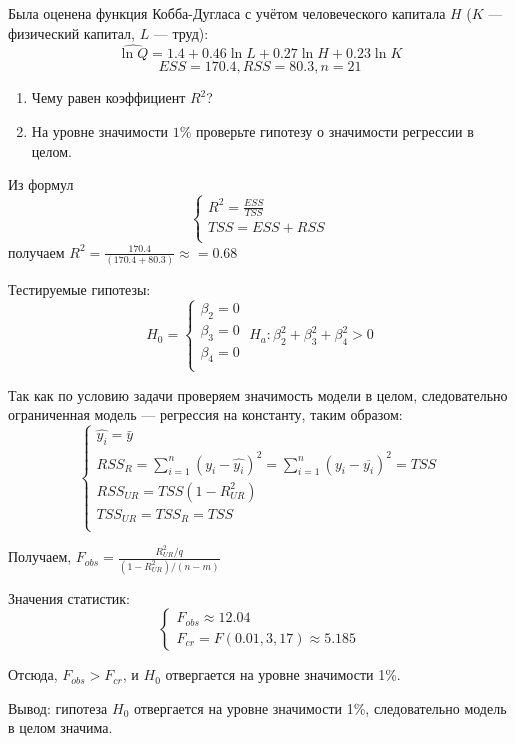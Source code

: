\begin{problem}
Была оценена функция Кобба-Дугласа с учётом человеческого капитала $H$ ($K$ — физический капитал, $L$ — труд):
\[
\widehat{\ln Q} = 1.4 + 0.46\ln L + 0.27\ln H + 0.23\ln K
\]
\[
ESS = 170.4, RSS = 80.3, n = 21
\]
\begin{enumerate}
\item Чему равен коэффициент $R^2$?
\item На уровне значимости $1\%$ проверьте гипотезу о значимости регрессии в целом.
\end{enumerate}


\begin{sol}
Из формул
\[
\begin{cases}
R^2=\frac{ESS}{TSS}\\
TSS=ESS+RSS\\
\end{cases}
\]
получаем $R^2=\frac{170.4}{(170.4+80.3)}\approx=0.68$

Тестируемые гипотезы:
\[
H_0=
\begin{cases}
\beta_2=0\\
\beta_3=0\\
\beta_4=0\\
\end{cases}
\;
H_a:\beta_2^2+\beta_3^2+\beta_4^2>0
\]

Так как по условию задачи проверяем значимость модели в целом, следовательно ограниченная модель — регрессия на константу, таким образом:
\[
\begin{cases}
\widehat{y_i}=\bar{y}\\
RSS_{R}=\sum_{i=1}^{n}(y_i-\widehat{y_i})^2=\sum_{i=1}^{n}(y_i-\overline{y_i})^2=TSS\\
RSS_{UR}=TSS(1-R^2_{UR})\\
TSS_{UR}=TSS_{R}=TSS\\
\end{cases}
\]

Получаем, $F_{obs}=\frac{R_{UR}^2/q}{(1-R^2_{UR})/(n-m)}$

Значения статистик:
\[
\begin{cases}
F_{obs}\approx 12.04\\
F_{cr}=F(0.01,3,17)\approx 5.185
\end{cases}
\]

Отсюда,
$F_{obs}>F_{cr}$, и  $H_0$ отвергается на уровне значимости 1\%.

Вывод: гипотеза $H_0$ отвергается на уровне значимости 1\%,
следовательно модель в целом значима.
\end{sol}
\end{problem}






